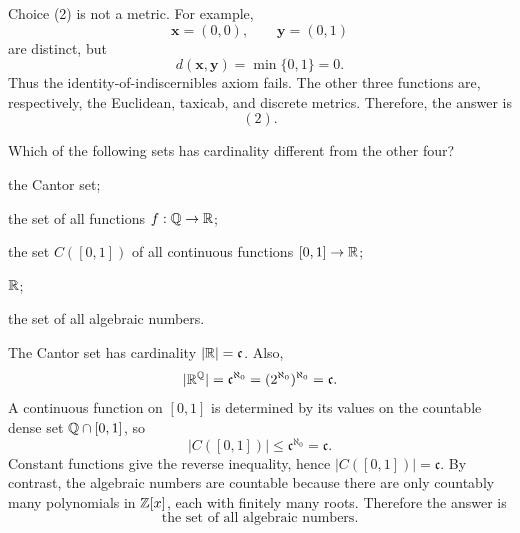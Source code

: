     \begin{solution}
        Choice (2) is not a metric. For example,
        \[
            \mathbf{x}=(0,0),
            \qquad
            \mathbf{y}=(0,1)
        \]
        are distinct, but
        \[
            d(\mathbf{x},\mathbf{y})
            =
            \min\{0,1\}
            =
            0.
        \]
        Thus the identity-of-indiscernibles axiom fails. The other three
        functions are, respectively, the Euclidean, taxicab, and discrete
        metrics. Therefore, the answer is
        \[
            \boxed{(2)}.
        \]
    \end{solution}

    \begin{expectedproblem}
        Which of the following sets has cardinality different from the other
        four?
        \begin{problemchoices}
            \item the Cantor set;
            \item the set of all functions $f:\mathbb{Q}\to\mathbb{R}$;
            \item the set $C([0,1])$ of all continuous functions
                  $[0,1]\to\mathbb{R}$;
            \item $\mathbb{R}$;
            \item the set of all algebraic numbers.
        \end{problemchoices}
    \end{expectedproblem}

    \begin{solution}
        The Cantor set has cardinality $|\mathbb{R}|=\mathfrak{c}$. Also,
        \[
            |\mathbb{R}^{\mathbb{Q}}|
            =
            \mathfrak{c}^{\aleph_0}
            =
            (2^{\aleph_0})^{\aleph_0}
            =
            \mathfrak{c}.
        \]
        A continuous function on $[0,1]$ is determined by its values on the
        countable dense set $\mathbb{Q}\cap[0,1]$, so
        \[
            |C([0,1])|\leq\mathfrak{c}^{\aleph_0}=\mathfrak{c}.
        \]
        Constant functions give the reverse inequality, hence
        $|C([0,1])|=\mathfrak{c}$. By contrast, the algebraic numbers are
        countable because there are only countably many polynomials in
        $\mathbb{Z}[x]$, each with finitely many roots. Therefore the answer is
        \[
            \boxed{\text{the set of all algebraic numbers}}.
        \]
    \end{solution}


